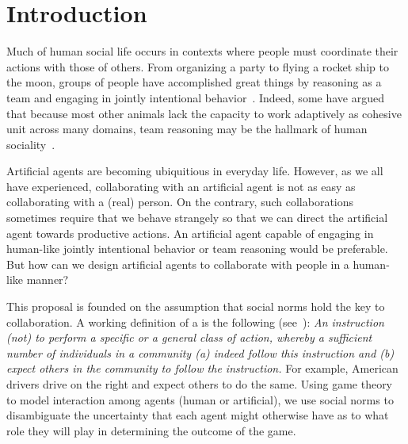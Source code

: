 
\section{Introduction}
\label{sec:intro}

Much of human social life occurs in contexts where people must 
coordinate their actions with those of others.  From organizing a
party to flying a rocket ship to the moon, groups of people have
accomplished great things by reasoning as a team and engaging in
jointly intentional behavior~\cite{searle1995construction}.  Indeed,
some have argued that because most other animals lack the capacity to
work adaptively as cohesive unit across many domains, team reasoning
may be the hallmark of human sociality~\cite{tomasello2005understanding}.


Artificial agents are becoming ubiquitious in everyday life.  However,
as we all have experienced, collaborating with an artificial agent is
not as easy as collaborating with a (real) person.  On the contrary,
such collaborations sometimes require that we behave strangely so that
we can direct the artificial agent towards productive actions.  An
artificial agent capable of engaging in human-like jointly intentional
behavior or team reasoning would be preferable.  But how can we design
artificial agents to collaborate with people in a human-like manner?

This proposal is founded on the assumption that social norms hold the
key to collaboration.  A working definition of a 
is the following (see~\cite{bicchieri2005grammar}):
%
  {\em An instruction (not) to perform a specific or a general class
    of action, whereby a sufficient number of individuals in a
    community (a) indeed follow this instruction and (b) expect others
    in the community to follow the instruction.}
%
\noindent
For example, American drivers drive on the right and expect others to do the same.
%
Using game theory to model interaction among agents (human or
artificial), we use social norms to disambiguate the uncertainty that
each agent might otherwise have as to what role they will play in
determining the outcome of the game.

